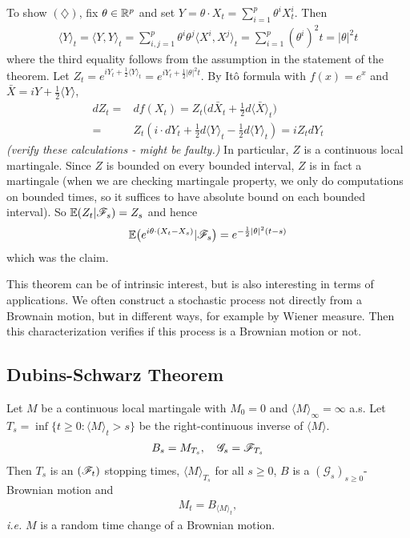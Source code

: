 \documentclass[10pt,a4paper]{article}
\newenvironment{proof}
{\begin{changemargin}{0.5cm}{0.5cm} 
	}%
	{\end{changemargin}
}
\newenvironment{p}
{\begin{proof} 
	}%
	{\end{proof}
}
\begin{document}
\begin{p}
To show $(\diamondsuit)$, fix $\theta \in \mathbb{R}^p$ and set $Y = \theta \cdot X_t = \sum_{i=1}^p \theta^i X_t^i$. Then
\begin{align*}
\langle Y \rangle_t = \langle Y , Y \rangle_t = \sum_{i,j=1}^p \theta^i \theta^j \langle X^i, X^j \rangle_t = \sum_{i=1}^p (\theta^i)^2 t = |\theta|^2 t
\end{align*}
where the third equality follows from the assumption in the statement of the theorem. Let $Z_t = e^{i Y_t + \frac{1}{2} \langle Y \rangle_t} = e^{iY_t + \frac{1}{2} |\theta|^2 t}$. By It\^o formula with $f(x) = e^x$ and $\bar{X}= iY + \frac{1}{2} \langle Y \rangle$,
\begin{align*}
dZ_t =& df(X_t) = Z_t \big( d\bar{X}_t + \frac{1}{2} d\langle \bar{X} \rangle_t \big) \\
=& Z_t (i \cdot dY_t + \frac{1}{2} d\langle Y \rangle_t - \frac{1}{2} d\langle Y \rangle_t) = iZ_t dY_t
\end{align*}
\emph{(verify these calculations - might be faulty.)} In particular, $Z$ is a continuous local martingale. Since $Z$ is bounded on every bounded interval, $Z$ is in fact a martingale (when we are checking martingale property, we only do computations on bounded times, so it suffices to have absolute bound on each bounded interval). So $\mathbb{E}(Z_t | \mathscr{F}_s) = Z_s$ and hence
\begin{align*}
\mathbb{E} \big( e^{i\theta \cdot (X_t - X_s)} | \mathscr{F}_s \big) = e^{-\frac{1}{2} |\theta|^2 (t-s)}
\end{align*}
which was the claim.

\eop
\end{p}
\s

This theorem can be of intrinsic interest, but is also interesting in terms of applications. We often construct a stochastic process not directly from a Brownain motion, but in different ways, for example by Wiener measure. Then this characterization verifies if this process is a Brownian motion or not.

\subsection{Dubins-Schwarz Theorem}

\thm Let $M$ be a continuous local martingale with $M_0 =0$ and $\langle M \rangle_{\infty} =\infty$ a.s. Let $T_s = \inf \{t\geq 0 : \langle M \rangle_t >s \}$ be the right-continuous inverse of $\langle M \rangle$.
\begin{align*}
B_s = M_{T_s}, \quad \mathscr{G}_s = \mathscr{F}_{T_s}
\end{align*}
Then $T_s$ is an $(\mathscr{F}_t)$ stopping times, $\langle M \rangle_{T_s}$ for all $s\geq 0$, $B$ is a $(\mathscr{G}_s)_{s\geq 0}$-Brownian motion and
\begin{align*}
M_t = B_{\langle M \rangle_t},
\end{align*}
\textit{i.e.} $M$ is a random time change of a Brownian motion.
\s
\end{document}
